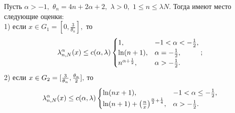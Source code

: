 \begin{theorem}
Пусть $\alpha>-1,$ $\theta_n=4n+2\alpha+2,$ $\lambda> 0,$ $1\le n\leq\lambda N.$ Тогда имеют место следующие оценки:\\
1) если $x\in G_1=[0, \frac{3}{\theta_n}],$ то
\begin{equation*}\label{gadz-eq19}
\lambda_{n,N}^{\alpha}(x)\leq c(\alpha, \lambda)
\begin{cases}
1, & -1<\alpha<-{1\over2},\\
\ln (n+1),&   \alpha=-\frac{1}{2},\\
n^{\alpha+\frac{1}{2}},&  \alpha> -\frac{1}{2}.
\end{cases};
\end{equation*}
2) если $x\in G_2=[\frac{3}{\theta_n}, {\theta_n\over 2}],$ то
\begin{equation*}\label{gadz-eq20}
\lambda_{n,N}^{\alpha}(x)\leq c(\alpha, \lambda)\begin{cases}
\ln(nx+1),&     -1<\alpha\leq-\frac{1}{2},\\
\ln(n+1)+{\left(n\over x\right)}^{{\alpha\over2}+{1\over4}},& \alpha>-\frac{1}{2}.
\end{cases}
\end{equation*}
\end{theorem}
